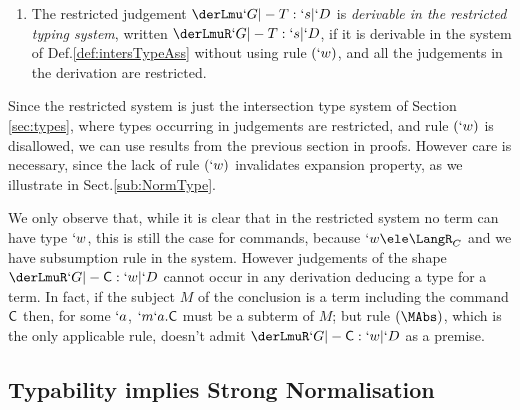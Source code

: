 \documentclass{lmcs}
\begin{document}
 \begin{defi} 
 \label{def:restrictedTypingSystem}

 \begin{enumerate}

 \firstitem
A \emph{restricted} \\ \emph{basis} is a basis $`G$ such that $`d \ele \LangR_D$ for all $x{:}`d \ele `G$. 
Similarly,
a \emph{restricted name context} is a context $`D $ with $`k \ele \LangR_C$ for all $`a{:}`k \ele `D $. 
Finally, for $T \ele \Terms \union \Commands$ we say that $ \derLmu `G |- T : `s | `D $ is a \emph{restricted judgement} if $`s \ele \LangR$ and
$`G$ and $`D $ are a restricted basis and a restricted name context respectively.

 \item
The restricted judgement $ \derLmu `G |- T : `s | `D $ is \emph{derivable in the restricted typing system}, written $ \derLmuR `G |- T: `s | `D $, if it is derivable 
in the system of Def.\skp\ref{def:intersTypeAss} without using rule $(`w)$, and all the judgements in the derivation are restricted.

 \end{enumerate}
 \end{defi}


Since the restricted system is just the intersection type system of Section\,\ref{sec:types}, where types occurring in judgements are restricted, and rule $(`w)$ is disallowed, we can use results from the previous section in proofs. 
However care is necessary, since the lack of rule $(`w)$ invalidates expansion property, as we illustrate in Sect.\skp\ref{sub:NormType}. 

We only observe that, while it is clear that in the restricted system no term can have type $`w$, this is still the case for commands, because $`w \ele \LangR_C$ and we have subsumption rule in the system. However judgements of the shape $\derLmuR `G |- \Cmd : `w | `D $ cannot occur in any derivation deducing a type for a term. 
In fact, if the subject $M$ of the conclusion is a term including the command $\textrm{\sf C}$ then,
for some $`a$, $`m`a.\textrm{\sf C}$ must be a subterm of $M$; but rule $(\MAbs)$, which is the only applicable rule, doesn't admit $\derLmuR `G |- \Cmd : `w | `D $ as a premise.

 \subsection{Typability implies Strong Normalisation} \label{subsec:type-SN}
\end{document}
